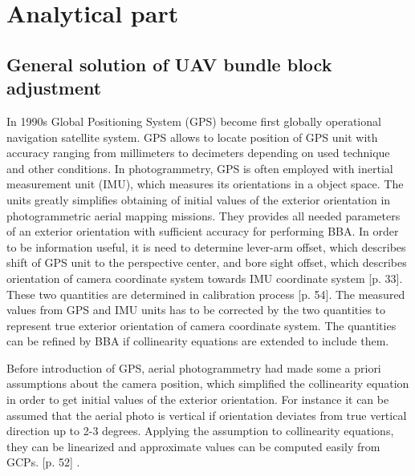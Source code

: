 \documentclass[a4paper,12pt]{article}
\begin{document}
\section{Analytical part}

\subsection{General solution of UAV bundle block adjustment}
\label{sec:solution}


In 1990s Global Positioning System (GPS) become first globally operational navigation satellite system.
GPS allows 
to locate position of GPS unit with accuracy ranging  from  millimeters to decimeters depending 
on used technique and other conditions. 
In photogrammetry, GPS is often employed with inertial measurement unit (IMU), which measures its orientations in a object space.
The units greatly simplifies obtaining of initial values of the exterior orientation in photogrammetric aerial mapping missions.
They provides all needed parameters of an exterior orientation with sufficient accuracy for performing BBA. 
In order to be information useful, it is need to determine 
lever-arm offset, which describes shift of GPS unit to the perspective center, and bore sight offset,
which describes orientation of camera coordinate system towards IMU coordinate system \cite{perry2009synthesized}[p. 33]. These two
quantities are determined in calibration process \cite{perry2009synthesized}[p. 54]. The measured values from GPS and IMU units has to
be corrected by the two quantities to represent true exterior orientation of camera coordinate system. The quantities
can be refined by BBA if collinearity equations are extended to include them.

\label{sec:assum}
Before introduction of GPS, aerial photogrammetry had made some a priori assumptions about the camera position,
which simplified the collinearity equation in order to get initial values of the exterior orientation. 
For instance it can be assumed that the aerial photo is vertical if orientation deviates from true vertical
direction up to 2-3 degrees. Applying the assumption to collinearity equations, they can be linearized and 
approximate values can be computed easily from GCPs. \cite{pavelka2004foto20}[p. 52]
.
\end{document}
